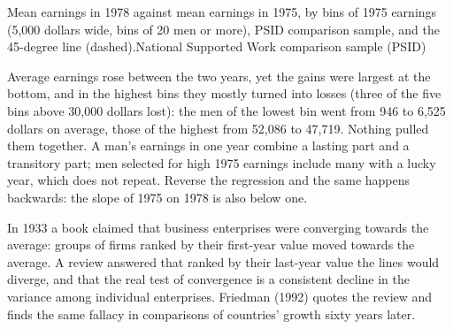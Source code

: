 \label{lst:b1:simple-regression:toward}

\label{out:b1:simple-regression:toward}

\begin{omchart}{Mean earnings in 1978 against mean earnings in 1975, by bins of 1975
earnings (5,000 dollars wide, bins of 20 men or more), PSID comparison sample, and the 45-degree line
(dashed).}{National Supported Work comparison sample (PSID)}
\end{omchart}

Average earnings rose between the two years, yet the gains were largest at
the bottom, and in the highest bins they mostly turned into losses (three of
the five bins above 30,000 dollars lost): the men of the lowest bin went
from 946 to 6,525 dollars on average, those of the highest from 52,086 to
47,719. %
Nothing pulled them together. A man's earnings in one year combine a lasting
part and a transitory part; men selected for high 1975 earnings include many
with a lucky year, which does not repeat. Reverse the regression and the
same happens backwards: the slope of 1975 on 1978 is also below one.

\begin{record}
In 1933 a book claimed that business enterprises were converging towards
the average: groups of firms ranked by their first-year value moved towards the
average. A review answered that ranked by their last-year value the lines
would diverge, and that the real test of convergence is a consistent
decline in the variance among individual enterprises. Friedman (1992)
quotes the review and finds the same fallacy in comparisons of countries'
growth sixty years later. %
\end{record}

